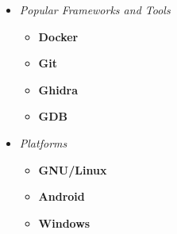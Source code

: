 \documentclass[9]{Resume}
\begin{document}
\begin{minipage}[t]{0.45\textwidth}
\begin{itemize}[noitemsep,nolistsep,leftmargin=*]
    \item[]\textit{Popular Frameworks and Tools}
            \vspace{-1em}
            \begin{multicols}{2}
            \begin{itemize}[leftmargin=*]
            \setlength\itemsep{-0.25em}
                \item[]\textbf{Docker}\hspace{25pt}
                \item[]\textbf{Git}\hspace{42pt}
                \item[]\textbf{Ghidra}\hspace{11pt}
                \item[]\textbf{GDB}\hspace{21pt}
            \end{itemize}
            \end{multicols}

    \item[]\textit{Platforms}
            \vspace{-1em}
            \begin{multicols}{2}
            \begin{itemize}[leftmargin=*]
            \setlength\itemsep{-0.25em}
            \item[]\textbf{GNU/Linux}\hspace{5pt}
            \item[]\textbf{Android}\hspace{20pt}
            \item[]\textbf{Windows}\hspace{3pt}
            \end{itemize}
            \end{multicols}
    \end{itemize}
        
\end{minipage}

\end{document}
